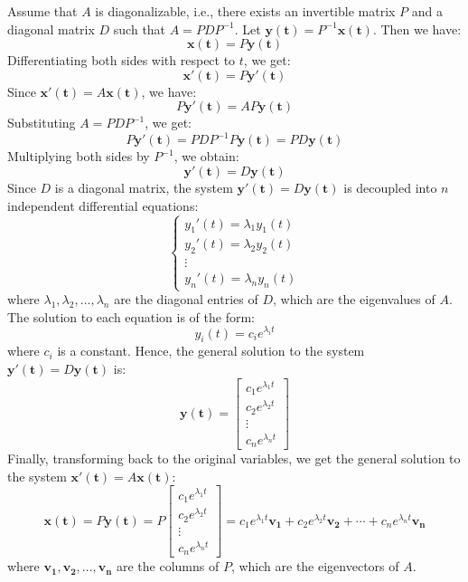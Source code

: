 \documentclass[10pt, a4paper]{article}
\newcommand{\vt}[1]{\mathbf{#1}}
\begin{document}
Assume that $A$ is diagonalizable, i.e., there exists an invertible matrix $P$ and a diagonal matrix $D$ such that $A = PDP^{-1}$. Let $\vt{y(t)} = P^{-1}\vt{x(t)}$. Then we have:
\[
\vt{x(t)} = P\vt{y(t)}
\]
Differentiating both sides with respect to $t$, we get:
\[
\vt{x'(t)} = P\vt{y'(t)}
\]
Since $\vt{x'(t)} = A\vt{x(t)}$, we have:
\[
P\vt{y'(t)} = AP\vt{y(t)}
\]
Substituting $A = PDP^{-1}$, we get:
\[
P\vt{y'(t)} = PDP^{-1}P\vt{y(t)} = PD\vt{y(t)}
\]
Multiplying both sides by $P^{-1}$, we obtain:
\[
\vt{y'(t)} = D\vt{y(t)}
\]
Since $D$ is a diagonal matrix, the system $\vt{y'(t)} = D\vt{y(t)}$ is decoupled into $n$ independent differential equations:
\[
\begin{cases}
y_1'(t) = \lambda_1 y_1(t)\\
y_2'(t) = \lambda_2 y_2(t)\\
\vdots\\
y_n'(t) = \lambda_n y_n(t)
\end{cases}
\]
where $\lambda_1, \lambda_2, \ldots, \lambda_n$ are the diagonal entries of $D$, which are the eigenvalues of $A$. The solution to each equation is of the form:
\[
y_i(t) = c_i e^{\lambda_i t}
\]
where $c_i$ is a constant. Hence, the general solution to the system $\vt{y'(t)} = D\vt{y(t)}$ is:
\[
\vt{y(t)} = \begin{bmatrix}
c_1 e^{\lambda_1 t}\\
c_2 e^{\lambda_2 t}\\
\vdots\\
c_n e^{\lambda_n t}
\end{bmatrix}
\]
Finally, transforming back to the original variables, we get the general solution to the system $\vt{x'(t)} = A\vt{x(t)}$:
\[
\vt{x(t)} = P\vt{y(t)} = P \begin{bmatrix}
c_1 e^{\lambda_1 t}\\
c_2 e^{\lambda_2 t}\\
\vdots\\
c_n e^{\lambda_n t}
\end{bmatrix} = c_1 e^{\lambda_1 t} \vt{v_1} + c_2 e^{\lambda_2 t} \vt{v_2} + \cdots + c_n e^{\lambda_n t} \vt{v_n}
\]
where $\vt{v_1}, \vt{v_2}, \ldots, \vt{v_n}$ are the columns of $P$, which are the eigenvectors of $A$.



\newpage



\end{document}

